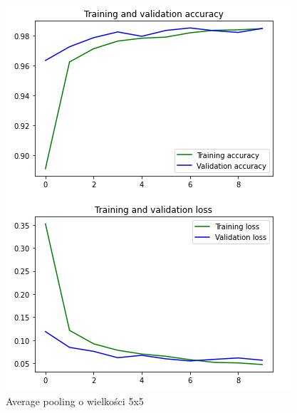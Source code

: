 \documentclass{article}
\begin{document}
\begin{figure}[h]
  \centering
  \includegraphics[width=\linewidth]{pooling_5_5.png}
  \caption{Average pooling o wielkości 5x5}
\end{figure}
\end{document}
